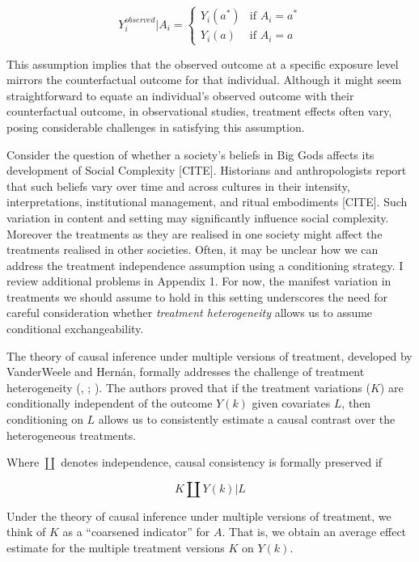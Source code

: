 \documentclass[
  singlecolumn,
  9pt]{article}
\begin{document}
\[
Y_i^{observed}|A_i = 
\begin{cases} 
Y_i(a^*) & \text{if } A_i = a^* \\
Y_i(a) & \text{if } A_i = a
\end{cases}
\]

This assumption implies that the observed outcome at a specific exposure
level mirrors the counterfactual outcome for that individual. Although
it might seem straightforward to equate an individual's observed outcome
with their counterfactual outcome, in observational studies, treatment
effects often vary, posing considerable challenges in satisfying this
assumption.

Consider the question of whether a society's beliefs in Big Gods affects
its development of Social Complexity {[}CITE{]}. Historians and
anthropologists report that such beliefs vary over time and across
cultures in their intensity, interpretations, institutional management,
and ritual embodiments {[}CITE{]}. Such variation in content and setting
may significantly influence social complexity. Moreover the treatments
as they are realised in one society might affect the treatments realised
in other societies. Often, it may be unclear how we can address the
treatment independence assumption using a conditioning strategy. I
review additional problems in Appendix 1. For now, the manifest
variation in treatments we should assume to hold in this setting
underscores the need for careful consideration whether \emph{treatment
heterogeneity} allows us to assume conditional exchangeability.

The theory of causal inference under multiple versions of treatment,
developed by VanderWeele and Hernán, formally addresses the challenge of
treatment heterogeneity (, ;
). The
authors proved that if the treatment variations (\(K\)) are
conditionally independent of the outcome \(Y(k)\) given covariates
\(L\), then conditioning on \(L\) allows us to consistently estimate a
causal contrast over the heterogeneous treatments.

Where \(\coprod\) denotes independence, causal consistency is formally
preserved if

\[
K \coprod Y(k) | L
\]

Under the theory of causal inference under multiple versions of
treatment, we think of \(K\) as a ``coarsened indicator'' for \(A\).
That is, we obtain an average effect estimate for the multiple treatment
versions \(K\) on \(Y(k)\).
\end{document}
